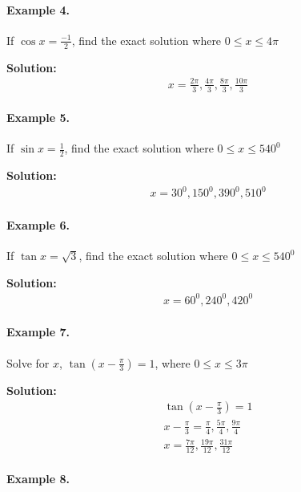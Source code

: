 \documentclass{article}
\begin{document}
\paragraph{Example 4.}

If $\cos x = \frac{-1}{2}$, find the exact solution where $0 \leq x \leq 4\pi$

{\scriptsize \textbf{Solution:}}
\[
  \begin{aligned}
    x = \frac{2\pi}{3}, \frac{4\pi}{3}, \frac{8\pi}{3}, \frac{10\pi}{3}
  \end{aligned}
\]

\paragraph{Example 5.}

If $\sin x = \frac{1}{2}$, find the exact solution where $0 \leq x \leq 540^{0}$

{\scriptsize \textbf{Solution:}}
\[
  \begin{aligned}
    x = 30^{0}, 150^{0}, 390^{0}, 510^{0}
  \end{aligned}
\]

\paragraph{Example 6.}

If $\tan x = \sqrt{3}$, find the exact solution where $0 \leq x \leq 540^{0}$

{\scriptsize \textbf{Solution:}}
\[
  \begin{aligned}
    x = 60^{0}, 240^{0}, 420^{0}
  \end{aligned}
\]

\paragraph{Example 7.}

Solve for $x$, $\tan(x-\frac{\pi}{3}) = 1$, where $0 \leq x \leq 3\pi$

{\scriptsize \textbf{Solution:}}
\[
  \begin{aligned}
    \tan(x-\frac{\pi}{3}) = 1 \\
    x - \frac{\pi}{3} = \frac{\pi}{4}, \frac{5\pi}{4}, \frac{9\pi}{4} \\
    x = \frac{7\pi}{12}, \frac{19\pi}{12}, \frac{31\pi}{12}
  \end{aligned}
\]

\paragraph{Example 8.}
\end{document}
